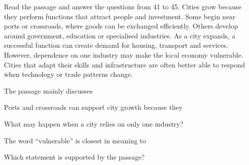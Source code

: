 \begin{baidoc}
\item[] Read the passage and answer the questions from 41 to 45.
Cities grow because they perform functions that attract people and investment. Some begin near ports or crossroads, where goods can be exchanged efficiently. Others develop around government, education or specialised industries. As a city expands, a successful function can create demand for housing, transport and services. However, dependence on one industry may make the local economy vulnerable. Cities that adapt their skills and infrastructure are often better able to respond when technology or trade patterns change.

\begin{ex}
The passage mainly discusses
\end{ex}

\begin{ex}
Ports and crossroads can support city growth because they
\end{ex}

\begin{ex}
What may happen when a city relies on only one industry?
\end{ex}

\begin{ex}
The word “vulnerable” is closest in meaning to
\end{ex}

\begin{ex}
Which statement is supported by the passage?
\end{ex}
\end{baidoc}

